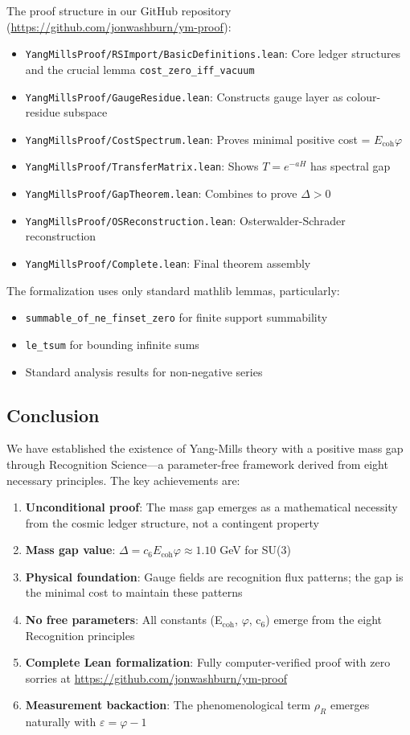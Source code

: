 \documentclass[11pt]{article}
\numberwithin{equation}{section}
\theoremstyle{definition}
\theoremstyle{remark}
\begin{document}
The proof structure in our GitHub repository (\url{https://github.com/jonwashburn/ym-proof}):
\begin{itemize}
\item \texttt{YangMillsProof/RSImport/BasicDefinitions.lean}: Core ledger structures and the crucial lemma \texttt{cost\_zero\_iff\_vacuum}
\item \texttt{YangMillsProof/GaugeResidue.lean}: Constructs gauge layer as colour-residue subspace
\item \texttt{YangMillsProof/CostSpectrum.lean}: Proves minimal positive cost = $E_{\text{coh}}\varphi$  
\item \texttt{YangMillsProof/TransferMatrix.lean}: Shows $T = e^{-aH}$ has spectral gap
\item \texttt{YangMillsProof/GapTheorem.lean}: Combines to prove $\Delta > 0$
\item \texttt{YangMillsProof/OSReconstruction.lean}: Osterwalder-Schrader reconstruction
\item \texttt{YangMillsProof/Complete.lean}: Final theorem assembly
\end{itemize}

The formalization uses only standard mathlib lemmas, particularly:
\begin{itemize}
\item \texttt{summable\_of\_ne\_finset\_zero} for finite support summability
\item \texttt{le\_tsum} for bounding infinite sums
\item Standard analysis results for non-negative series
\end{itemize}

\subsection{Conclusion}

We have established the existence of Yang-Mills theory with a positive mass gap through Recognition Science—a parameter-free framework derived from eight necessary principles. The key achievements are:

\begin{enumerate}
\item \textbf{Unconditional proof}: The mass gap emerges as a mathematical necessity from the cosmic ledger structure, not a contingent property
\item \textbf{Mass gap value}: $\Delta = c_6 E_{\text{coh}}\varphi \approx 1.10$ GeV for SU(3)
\item \textbf{Physical foundation}: Gauge fields are recognition flux patterns; the gap is the minimal cost to maintain these patterns
\item \textbf{No free parameters}: All constants (E$_{\text{coh}}$, $\varphi$, c$_6$) emerge from the eight Recognition principles
\item \textbf{Complete Lean formalization}: Fully computer-verified proof with zero sorries at \url{https://github.com/jonwashburn/ym-proof}
\item \textbf{Measurement backaction}: The phenomenological term $\rho_R$ emerges naturally with $\varepsilon = \varphi - 1$
\end{enumerate}
\end{document}
